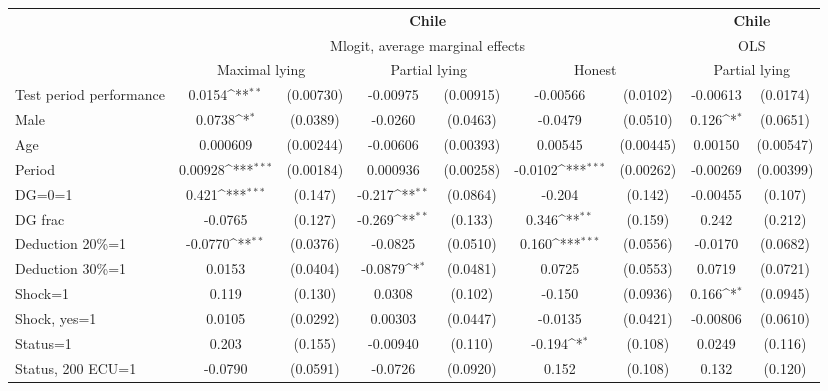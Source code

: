 \def\sym#1{\ifmmode^{#1}\else\(^{#1}\)\fi}
\begin{tabular}{l|cccccc|cc}
\hline\hline
&\multicolumn{6}{c|}{\bf Chile}&\multicolumn{2}{c}{\bf Chile}\\ &\multicolumn{6}{c|}{Mlogit, average marginal effects }&\multicolumn{2}{c}{OLS}\\
                &\multicolumn{2}{c}{Maximal lying}&\multicolumn{2}{c}{Partial lying}&\multicolumn{2}{c}{Honest}  &\multicolumn{2}{c}{Partial lying}\\
\hline
Test period performance&   0.0154\sym{**} &(0.00730)& -0.00975         &(0.00915)& -0.00566         & (0.0102)& -0.00613         & (0.0174)\\
Male            &   0.0738\sym{*}  & (0.0389)&  -0.0260         & (0.0463)&  -0.0479         & (0.0510)&    0.126\sym{*}  & (0.0651)\\
Age             & 0.000609         &(0.00244)& -0.00606         &(0.00393)&  0.00545         &(0.00445)&  0.00150         &(0.00547)\\
Period          &  0.00928\sym{***}&(0.00184)& 0.000936         &(0.00258)&  -0.0102\sym{***}&(0.00262)& -0.00269         &(0.00399)\\
DG=0=1          &    0.421\sym{***}&  (0.147)&   -0.217\sym{**} & (0.0864)&   -0.204         &  (0.142)& -0.00455         &  (0.107)\\
DG frac         &  -0.0765         &  (0.127)&   -0.269\sym{**} &  (0.133)&    0.346\sym{**} &  (0.159)&    0.242         &  (0.212)\\
Deduction 20\%=1&  -0.0770\sym{**} & (0.0376)&  -0.0825         & (0.0510)&    0.160\sym{***}& (0.0556)&  -0.0170         & (0.0682)\\
Deduction 30\%=1&   0.0153         & (0.0404)&  -0.0879\sym{*}  & (0.0481)&   0.0725         & (0.0553)&   0.0719         & (0.0721)\\
Shock=1         &    0.119         &  (0.130)&   0.0308         &  (0.102)&   -0.150         & (0.0936)&    0.166\sym{*}  & (0.0945)\\
Shock, yes=1    &   0.0105         & (0.0292)&  0.00303         & (0.0447)&  -0.0135         & (0.0421)& -0.00806         & (0.0610)\\
Status=1        &    0.203         &  (0.155)& -0.00940         &  (0.110)&   -0.194\sym{*}  &  (0.108)&   0.0249         &  (0.116)\\
Status, 200 ECU=1&  -0.0790         & (0.0591)&  -0.0726         & (0.0920)&    0.152         &  (0.108)&    0.132         &  (0.120)\\

\end{tabular}
